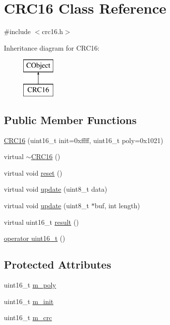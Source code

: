 \hypertarget{class_c_r_c16}{\section{C\-R\-C16 Class Reference}
\label{class_c_r_c16}
}


{\ttfamily \#include $<$crc16.\-h$>$}

Inheritance diagram for C\-R\-C16\-:\begin{figure}[H]
\begin{center}
\leavevmode
\includegraphics[height=2.000000cm]{d5/df3/class_c_r_c16}
\end{center}
\end{figure}
\subsection*{Public Member Functions}
\begin{DoxyCompactItemize}
\item 
\hyperlink{class_c_r_c16_a2317eff72b4509289399f5c6b6306db2}{C\-R\-C16} (uint16\-\_\-t init=0xffff, uint16\-\_\-t poly=0x1021)
\item 
virtual \hyperlink{class_c_r_c16_a017c6bb359a7403dedc5db838ceb627d}{$\sim$\-C\-R\-C16} ()
\item 
virtual void \hyperlink{class_c_r_c16_ad948d7638a1d07540db96cb649ce0d52}{reset} ()
\item 
virtual void \hyperlink{class_c_r_c16_afd577ee51489a3e07c4de201b8a3fdf4}{update} (uint8\-\_\-t data)
\item 
virtual void \hyperlink{class_c_r_c16_aea5d7fae41950ebc9ab79ec0445900f5}{update} (uint8\-\_\-t $\ast$buf, int length)
\item 
virtual uint16\-\_\-t \hyperlink{class_c_r_c16_aa70e96e936eea96361292dfc3f1a71fc}{result} ()
\item 
\hyperlink{class_c_r_c16_ac6704db61d9df8cf08e8f5697b7f8b31}{operator uint16\-\_\-t} ()
\end{DoxyCompactItemize}
\subsection*{Protected Attributes}
\begin{DoxyCompactItemize}
\item 
uint16\-\_\-t \hyperlink{class_c_r_c16_ae3d38db69627b3335b5a5f008057f98c}{m\-\_\-poly}
\item 
uint16\-\_\-t \hyperlink{class_c_r_c16_a85c28fd3fef555b4d25b0d18186fae6a}{m\-\_\-init}
\item 
uint16\-\_\-t \hyperlink{class_c_r_c16_a010ae9e2779e15bd4baf9a56980cd272}{m\-\_\-crc}
\end{DoxyCompactItemize}


